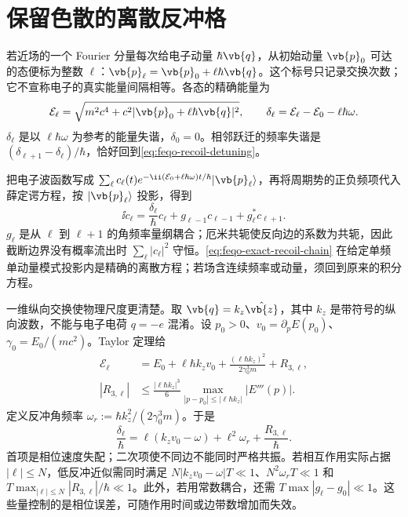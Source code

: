 \section{保留色散的离散反冲格}
\label{chap:feqo-recoil-lattice}

若近场的一个 Fourier 分量每次给电子动量 \(\hbar\vb{q}\)，从初始动量 \(\vb{p}_0\) 可达的态便标为整数 \(\ell\)：\(\vb{p}_\ell=\vb{p}_0+\ell\hbar\vb{q}\)。这个标号只记录交换次数；它不宣称电子的真实能量间隔相等。各态的精确能量为
\begin{equation}
\mathcal E_\ell=\sqrt{m^2c^4+c^2|\vb{p}_0+\ell\hbar\vb{q}|^2},\qquad
\delta_\ell=\mathcal E_\ell-\mathcal E_0-\ell\hbar\omega .
\label{eq:feqo-channel-lattice}
\end{equation}
\(\delta_\ell\) 是以 \(\ell\hbar\omega\) 为参考的能量失谐，\(\delta_0=0\)。相邻跃迁的频率失谐是 \((\delta_{\ell+1}-\delta_\ell)/\hbar\)，恰好回到\cref{eq:feqo-recoil-detuning}。

把电子波函数写成 \(\sum_\ell c_\ell(t)e^{-\ii(\mathcal E_0+\ell\hbar\omega)t/\hbar}|\vb{p}_\ell\rangle\)，再将周期势的正负频项代入薛定谔方程，按 \(|\vb{p}_\ell\rangle\) 投影，得到
\begin{equation}
\ii\dot c_\ell=\frac{\delta_\ell}{\hbar}c_\ell
+g_{\ell-1}c_{\ell-1}+g_\ell^*c_{\ell+1}.
\label{eq:feqo-exact-recoil-chain}
\end{equation}
\(g_\ell\) 是从 \(\ell\) 到 \(\ell+1\) 的角频率量纲耦合；厄米共轭使反向边的系数为共轭，因此截断边界没有概率流出时 \(\sum_\ell|c_\ell|^2\) 守恒。\cref{eq:feqo-exact-recoil-chain} 在给定单频单动量模式投影内是精确的离散方程；若场含连续频率或动量，须回到原来的积分方程。

一维纵向交换使物理尺度更清楚。取 \(\vb{q}=k_z\hat{\vb{z}}\)，其中 \(k_z\) 是带符号的纵向波数，不能与电子电荷 \(q=-e\) 混淆。设 \(p_0>0\)、\(v_0=\partial_pE(p_0)\)、\(\gamma_0=E_0/(mc^2)\)。Taylor 定理给
\begin{align*}
\mathcal E_\ell
&=E_0+\ell\hbar k_zv_0
+\frac{(\ell\hbar k_z)^2}{2\gamma_0^3m}+R_{3,\ell},\\
|R_{3,\ell}|&\leq\frac{|\ell\hbar k_z|^3}{6}
\max_{|p-p_0|\leq|\ell\hbar k_z|}|E'''(p)|.
\end{align*}
定义反冲角频率 \(\omega_r:=\hbar k_z^2/(2\gamma_0^3m)\)。于是
\begin{equation}
\frac{\delta_\ell}{\hbar}
=\ell(k_zv_0-\omega)+\ell^2\omega_r+\frac{R_{3,\ell}}{\hbar}.
\label{eq:feqo-recoil-expansion}
\end{equation}
首项是相位速度失配；二次项使不同边不能同时严格共振。若相互作用实际占据 \(|\ell|\leq N\)，低反冲近似需同时满足 \(N|k_zv_0-\omega|T\ll1\)、\(N^2\omega_rT\ll1\) 和 \(T\max_{|\ell|\leq N}|R_{3,\ell}|/\hbar\ll1\)。此外，若用常数耦合，还需 \(T\max|g_\ell-g_0|\ll1\)。这些量控制的是相位误差，可随作用时间或边带数增加而失效。

